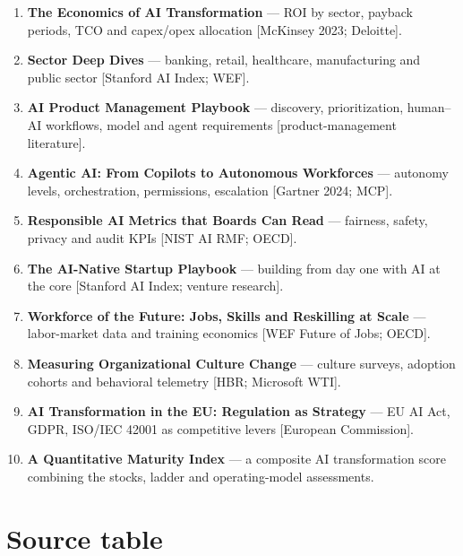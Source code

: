 \begin{enumerate}
  \item \textbf{The Economics of AI Transformation} — ROI by sector, payback
        periods, TCO and capex/opex allocation [McKinsey 2023; Deloitte].
  \item \textbf{Sector Deep Dives} — banking, retail, healthcare, manufacturing
        and public sector [Stanford AI Index; WEF].
  \item \textbf{AI Product Management Playbook} — discovery, prioritization,
        human--AI workflows, model and agent requirements [product-management
        literature].
  \item \textbf{Agentic AI: From Copilots to Autonomous Workforces} — autonomy
        levels, orchestration, permissions, escalation [Gartner 2024; MCP].
  \item \textbf{Responsible AI Metrics that Boards Can Read} — fairness,
        safety, privacy and audit KPIs [NIST AI RMF; OECD].
  \item \textbf{The AI-Native Startup Playbook} — building from day one with
        AI at the core [Stanford AI Index; venture research].
  \item \textbf{Workforce of the Future: Jobs, Skills and Reskilling at Scale}
        — labor-market data and training economics [WEF Future of Jobs; OECD].
  \item \textbf{Measuring Organizational Culture Change} — culture surveys,
        adoption cohorts and behavioral telemetry [HBR; Microsoft WTI].
  \item \textbf{AI Transformation in the EU: Regulation as Strategy} — EU AI
        Act, GDPR, ISO/IEC 42001 as competitive levers [European Commission].
  \item \textbf{A Quantitative Maturity Index} — a composite AI transformation
        score combining the stocks, ladder and operating-model assessments.
\end{enumerate}

\section{Source table}

